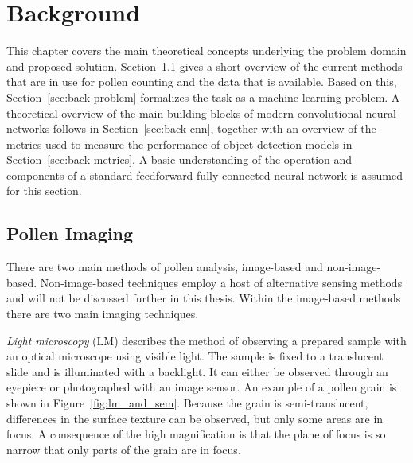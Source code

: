 \chapter{Background}\label{cha:background}
This chapter covers the main theoretical concepts underlying the problem domain and proposed solution.
Section~\ref{sec:back-pollen} gives a short overview of the current methods that are in use for pollen counting and the data that is available. Based on this, Section~\ref{sec:back-problem} formalizes the task as a machine learning problem.
A theoretical overview of the main building blocks of modern convolutional neural networks follows in Section~\ref{sec:back-cnn}, together with an overview of the metrics used to measure the performance of object detection models in Section~\ref{sec:back-metrics}.
A basic understanding of the operation and components of a standard feedforward fully connected neural network is assumed for this section.

\section{Pollen Imaging}\label{sec:back-pollen}
There are two main methods of pollen analysis, image-based and non-image-based.
Non-image-based techniques employ a host of alternative sensing methods and will not be discussed further in this thesis.
Within the image-based methods there are two main imaging techniques.

\textit{Light microscopy} (LM) describes the method of observing a prepared sample with an optical microscope using visible light.
The sample is fixed to a translucent slide and is illuminated with a backlight.
It can either be observed through an eyepiece or photographed with an image sensor.
An example of a pollen grain is shown in Figure~\ref{fig:lm_and_sem}.
Because the grain is semi-translucent, differences in the surface texture can be observed, but only some areas are in focus.
A consequence of the high magnification is that the plane of focus is so narrow that only parts of the grain are in focus.

